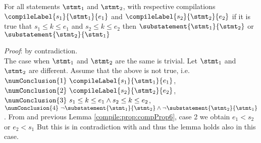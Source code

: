 \begin{compPropApp}\label{compile:prop:commonInstr}
   For all statements $\stmt_1$ and $\stmt_2$, with respective compilations 
   $\compileLabel{s_1}{\stmt_1}{e_1}$ and  $\compileLabel{s_2}{\stmt_2}{e_2}$ if it is true that 
   $s_1 \le k \le e_1 $ and $ s_2 \le k \le e_2$ then
   $ \substatement{\stmt_1}{\stmt_2}$ or   $ \substatement{\stmt_2}{\stmt_1}$
   
\end{compPropApp}
\textit{Proof}: by contradiction.\\
The case when  $\stmt_1$ and $\stmt_2$ are the same is trivial.
Let $\stmt_1$ and $\stmt_2$ are different.
Assume that the above is not true, i.e. 
$\numConclusion{1} \ \compileLabel{s_1}{\stmt_1}{e_1}  $,
$\numConclusion{2} \ \compileLabel{s_2}{\stmt_2}{e_2}$, 
$\numConclusion{3} \ s_1 \le k \le e_1 \wedge  s_2 \le k \le e_2$, 
$\numConclusion{4} \  \neg \substatement{\stmt_1}{\stmt_2} \wedge \neg   \substatement{\stmt_2}{\stmt_1} $.
From   and previous Lemma \ref{compile:prop:compProp6}, case 2 we obtain $e_1 < s_2  $ or $ e_2 < s_1$
But this is in contradiction with  and thus the lemma holds also in this case.

\Qed\\





%



